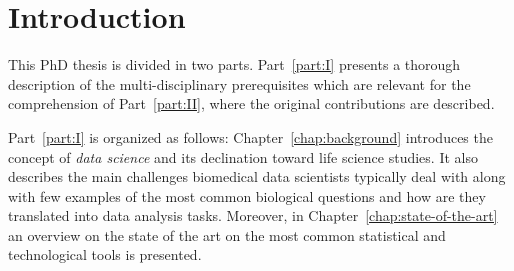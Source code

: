 
\chapter{Introduction} \label{chapter:introduction}


This PhD thesis is divided in two parts. Part~\ref{part:I} presents a thorough description of the multi-disciplinary prerequisites which are relevant for the comprehension of Part~\ref{part:II}, where the original contributions are described.

Part~\ref{part:I} is organized as follows: Chapter~\ref{chap:background} introduces the concept of \textit{data science} and its declination toward life science studies. It also describes the main challenges biomedical data scientists typically deal with along with few examples of the most common biological questions and how are they translated into data analysis tasks. Moreover, in Chapter~\ref{chap:state-of-the-art} an overview on the state of the art on the most common statistical and technological tools is presented.
